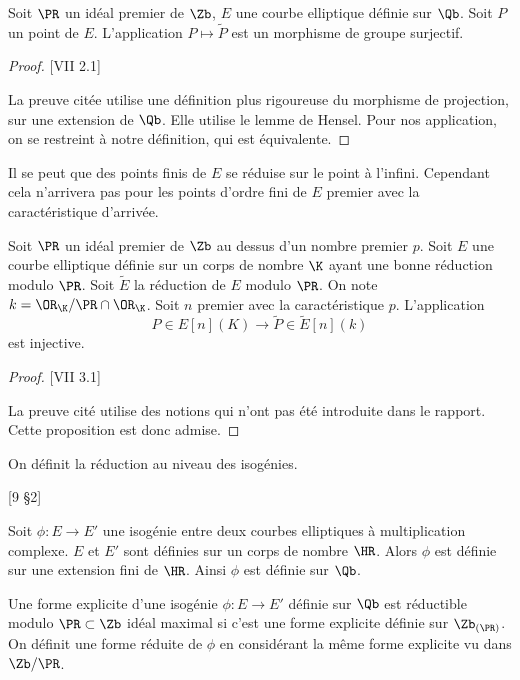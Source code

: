 \begin{Prop}
	
	Soit $\PR$ un idéal premier de $\Zb$, $E$ une courbe elliptique définie sur $\Qb$. Soit $P$ un point de $E$. L'application $P\mapsto\tilde{P}$ est un morphisme de groupe surjectif.
\end{Prop}

\begin{proof}\cite{Sil94}[VII 2.1]
	
	La preuve citée utilise une définition plus rigoureuse du morphisme de projection, sur une extension de $\Qb$. Elle utilise le lemme de Hensel. Pour nos application, on se restreint à notre définition, qui est équivalente. 
\end{proof}

Il se peut que des points finis de $E$ se réduise sur le point à l'infini. Cependant cela n'arrivera pas pour les points d'ordre fini de $E$ premier avec la caractéristique d'arrivée.

\begin{Prop}
	Soit $\PR$ un idéal premier de $\Zb$ au dessus d'un nombre premier $p$. Soit $E$ une courbe elliptique définie sur un corps de nombre $\K$ ayant une bonne réduction modulo $\PR$. Soit $\tilde{E}$ la réduction de $E$ modulo $\PR$. On note $k = \OR_{\K}/\PR\cap\OR_{\K}$. Soit $n$ premier avec la caractéristique $p$. L'application
	\begin{equation*}
		P\in E[n](K) \rightarrow \tilde{P}\in \tilde{E}[n](k)
	\end{equation*}
	est injective.
\end{Prop}

\begin{proof}
	\cite{Sil09}[VII 3.1]
	
	La preuve cité utilise des notions qui n'ont pas été introduite dans le rapport. Cette proposition est donc admise. 
\end{proof}

On définit la réduction au niveau des isogénies. 

\begin{Prop}\cite{Lang1987}[9 \S2]
	
	Soit $\phi : E\rightarrow E'$ une isogénie entre deux courbes elliptiques à multiplication complexe. $E$ et $E'$ sont définies sur un corps de nombre $\HR$. Alors $\phi$ est définie sur une extension fini de $\HR$. Ainsi $\phi$ est définie sur $\Qb$.
\end{Prop}

\begin{Def}
	Une forme explicite d'une isogénie $\phi : E\rightarrow E'$ définie sur $\Qb$ est réductible modulo $\PR\subset\Zb$ idéal maximal si c'est une forme explicite définie sur $\Zb_{\left( \PR\right) }$. On définit une forme réduite de $\phi$ en considérant la même forme explicite vu dans $\Zb/\PR$. 
\end{Def}

